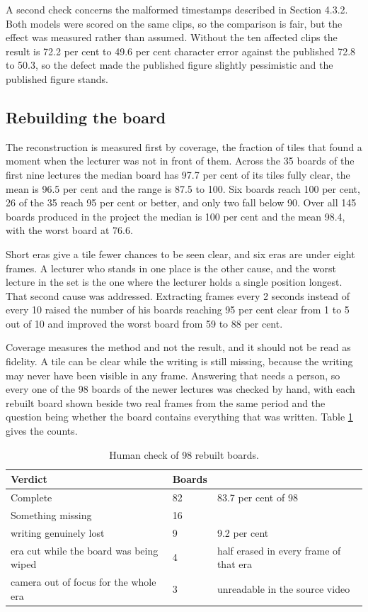 A second check concerns the malformed timestamps described in Section 4.3.2. Both models
were scored on the same clips, so the comparison is fair, but the effect was measured
rather than assumed. Without the ten affected clips the result is 72.2 per cent to 49.6
per cent character error against the published 72.8 to 50.3, so the defect made the
published figure slightly pessimistic and the published figure stands.

\subsection{Rebuilding the board}
\label{sec:board-coverage}

The reconstruction is measured first by coverage, the fraction of tiles that found a
moment when the lecturer was not in front of them. Across the 35 boards of the first nine
lectures the median board has 97.7 per cent of its tiles fully clear, the mean is 96.5 per
cent and the range is 87.5 to 100. Six boards reach 100 per cent, 26 of the 35 reach 95
per cent or better, and only two fall below 90. Over all 145 boards produced in the
project the median is 100 per cent and the mean 98.4, with the worst board at 76.6.

Short eras give a tile fewer chances to be seen clear, and six eras are under eight
frames. A lecturer who stands in one place is the other cause, and the worst lecture in
the set is the one where the lecturer holds a single position longest. That second cause
was addressed. Extracting frames every 2 seconds instead of every 10
raised the number of his boards reaching 95 per cent clear from 1 to 5 out of 10 and
improved the worst board from 59 to 88 per cent.

Coverage measures the method and not the result, and it should not be read as
fidelity. A tile can be clear while the writing is still missing, because the writing may
never have been visible in any frame. Answering that needs a person, so every one of the
98 boards of the newer lectures was checked by hand, with each rebuilt board shown beside
two real frames from the same period and the question being whether the board contains
everything that was written. Table \ref{tab:completeness} gives the counts.

\begin{table}[htbp]
\centering
\caption{Human check of 98 rebuilt boards.}
\label{tab:completeness}
\small
\begin{tabular}{p{6.4cm}p{2.0cm}p{4.8cm}}
\toprule
Verdict & Boards & \\
\midrule
Complete & 82 & 83.7 per cent of 98 \\
Something missing & 16 & \\
\quad writing genuinely lost & 9 & 9.2 per cent \\
\quad era cut while the board was being wiped & 4 &
half erased in every frame of that era \\
\quad camera out of focus for the whole era & 3 &
unreadable in the source video \\
\bottomrule
\end{tabular}
\end{table}


